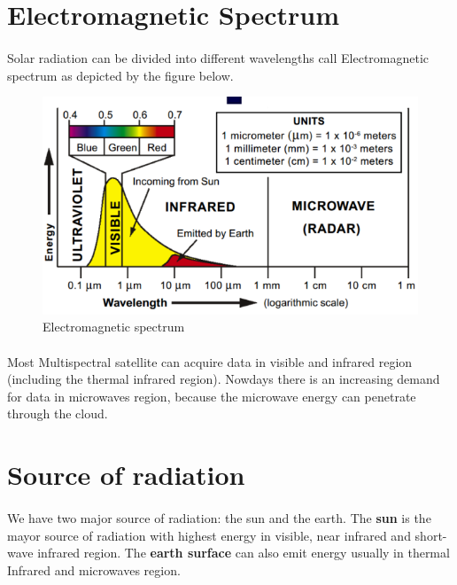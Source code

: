 \section{Electromagnetic Spectrum}
\paragraph{}
Solar radiation can be divided into different wavelengths call Electromagnetic spectrum as depicted by the figure below.
\begin{figure}[H]
\begin{center}
\includegraphics[scale=0.8]{image1.png} %
\end{center}
\caption{Electromagnetic spectrum}
\label{Electromagnetic spectrum}%
\end{figure}
\paragraph{}
Most Multispectral satellite can acquire data in visible and infrared region (including the thermal infrared region).  Nowdays there is an increasing demand for data in microwaves region, because the microwave energy can penetrate through the cloud.
\section{Source of radiation}
\paragraph{}
We have two major source of radiation: the sun and the earth. \newline
The \textbf{sun} is the mayor source of radiation with highest energy in visible, near infrared and short-wave infrared region.\newline
The \textbf{earth surface} can also emit energy usually in thermal Infrared and microwaves region.
